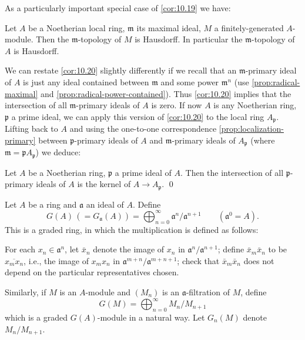 As a particularly important special case of \eqref{cor:10.19} we have:

\begin{corollary}\label{cor:10.20}
    Let $A$ be a Noetherian local ring, $\mathfrak{m}$ its maximal ideal, $M$ a finitely-generated $A$-module. Then the $\mathfrak{m}$-topology of $M$ is Hausdorff. In particular the $\mathfrak{m}$-topology of $A$ is Hausdorff. 
\end{corollary}

We can restate \eqref{cor:10.20} slightly differently if we recall that an $\mathfrak{m}$-primary ideal of $A$ is just any ideal contained between $\mathfrak{m}$ and some power $\mathfrak{m}^n$ (use \eqref{prop:radical-maximal} and \eqref{prop:radical-power-contained}). Thus \eqref{cor:10.20} implies that the intersection of all $\mathfrak{m}$-primary ideals of $A$ is zero. If now $A$ is any Noetherian ring, $\mathfrak{p}$ a prime ideal, we can apply this version of \eqref{cor:10.20} to the local ring $A_{\mathfrak{p}}$. Lifting back to $A$ and using the one-to-one correspondence \eqref{prop:localization-primary} between $\mathfrak{p}$-primary ideals of $A$ and $\mathfrak{m}$-primary ideals of $A_{\mathfrak{p}}$ (where $\mathfrak{m} = \mathfrak{p}A_{\mathfrak{p}}$) we deduce:

\begin{corollary}\label{cor:10.21}
    Let $A$ be a Noetherian ring, $\mathfrak{p}$ a prime ideal of $A$. Then the intersection of all $\mathfrak{p}$-primary ideals of $A$ is the kernel of $A \to A_{\mathfrak{p}}$. \qed
\end{corollary}

Let $A$ be a ring and $\mathfrak{a}$ an ideal of $A$. Define
\[
G(A) \,(= G_{\mathfrak{a}}(A)) = \bigoplus_{n=0}^{\infty} \mathfrak{a}^n/\mathfrak{a}^{n+1} \qquad (\mathfrak{a}^0 = A).
\]
This is a graded ring, in which the multiplication is defined as follows:

For each $x_n \in \mathfrak{a}^n$, let $\bar{x}_n$ denote the image of $x_n$ in $\mathfrak{a}^n/\mathfrak{a}^{n+1}$; define $\bar{x}_m \bar{x}_n$ to be $\overline{x_m x_n}$, i.e., the image of $x_m x_n$ in $\mathfrak{a}^{m+n}/\mathfrak{a}^{m+n+1}$; check that $\bar{x}_m \bar{x}_n$ does not depend on the particular representatives chosen.

Similarly, if $M$ is an $A$-module and $(M_n)$ is an $\mathfrak{a}$-filtration of $M$, define
\[
G(M) = \bigoplus_{n=0}^{\infty} M_n/M_{n+1}
\]
which is a graded $G(A)$-module in a natural way. Let $G_n(M)$ denote $M_n/M_{n+1}$.

